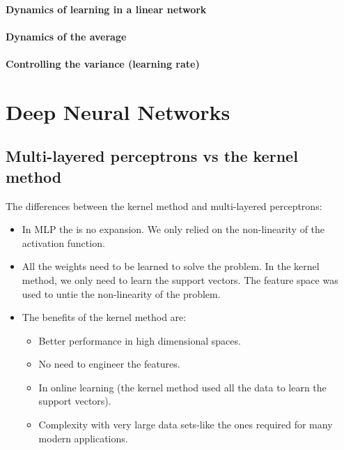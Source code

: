 \documentclass[11pt]{book} %
\begin{document}
%
%

\subsubsection{Dynamics of learning in a linear network}


%
%

\subsubsection{Dynamics of the average}


%
%

\subsubsection{Controlling the variance (learning rate)}


%
%
%
%
%
%
%
%
%
%
%
%
%
%
%
%


\chapter{Deep Neural Networks}

\section{Multi-layered perceptrons vs the kernel method}
The differences between the kernel method and multi-layered perceptrons:
\begin{itemize}
    \item In MLP the is no expansion. We only relied on the non-linearity of the activation function.
    \item All the weights need to be learned to solve the problem. In the kernel method, we only need to learn the support vectors. 
    The feature space was used to untie the non-linearity of the problem.
    \item The benefits of the kernel method are:
    \begin{itemize}
        \item Better performance in high dimensional spaces.
        \item No need to engineer the features.
        \item In online learning (the kernel method used all the data to learn the support vectors).
        \item Complexity with very large data sets-like the ones required for many modern applications.
    \end{itemize}
\end{itemize}
\end{document}
